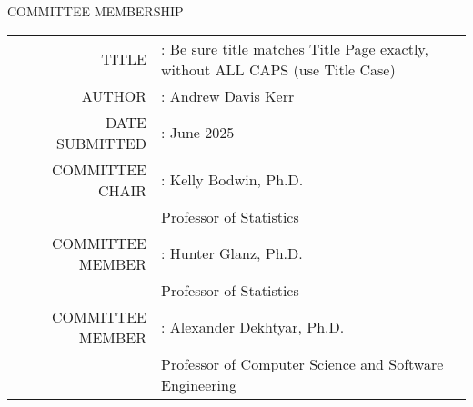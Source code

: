 \begin{center}
COMMITTEE MEMBERSHIP

\vspace{.5in}

\begin{tabular}{r@{}l}
TITLE & : \hspace*{1.5em}Be sure title matches Title Page exactly, without ALL CAPS (use Title Case) \\[.5in]
AUTHOR & : \hspace*{1.5em}Andrew Davis Kerr \\[.5in]
DATE SUBMITTED & : \hspace*{1.5em}June 2025 \\[2in]
COMMITTEE CHAIR & : \hspace*{1.5em}Kelly Bodwin, Ph.D. \\
 & \hspace*{2.2em}Professor of Statistics \\[.5in]
COMMITTEE MEMBER & : \hspace*{1.5em}Hunter Glanz, Ph.D. \\
 & \hspace*{2.2em}Professor of Statistics \\[.5in]
COMMITTEE MEMBER & : \hspace*{1.5em}Alexander Dekhtyar, Ph.D. \\
 & \hspace*{2.2em}Professor of Computer Science and Software Engineering \\
\end{tabular}
\end{center}
\clearpage